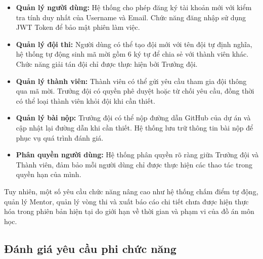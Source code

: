 ﻿\documentclass[12pt,a4paper]{report}
\begin{document}
\begin{itemize}
	\item \textbf{Quản lý người dùng:} Hệ thống cho phép đăng ký tài khoản mới với kiểm tra tính duy nhất của Username và Email. Chức năng đăng nhập sử dụng JWT Token để bảo mật phiên làm việc.
	
	\item \textbf{Quản lý đội thi:} Người dùng có thể tạo đội mới với tên đội tự định nghĩa, hệ thống tự động sinh mã mời gồm 6 ký tự để chia sẻ với thành viên khác. Chức năng giải tán đội chỉ được thực hiện bởi Trưởng đội.
	
	\item \textbf{Quản lý thành viên:} Thành viên có thể gửi yêu cầu tham gia đội thông qua mã mời. Trưởng đội có quyền phê duyệt hoặc từ chối yêu cầu, đồng thời có thể loại thành viên khỏi đội khi cần thiết.
	
	\item \textbf{Quản lý bài nộp:} Trưởng đội có thể nộp đường dẫn GitHub của dự án và cập nhật lại đường dẫn khi cần thiết. Hệ thống lưu trữ thông tin bài nộp để phục vụ quá trình đánh giá.
	
	\item \textbf{Phân quyền người dùng:} Hệ thống phân quyền rõ ràng giữa Trưởng đội và Thành viên, đảm bảo mỗi người dùng chỉ được thực hiện các thao tác trong quyền hạn của mình.
\end{itemize}

Tuy nhiên, một số yêu cầu chức năng nâng cao như hệ thống chấm điểm tự động, quản lý Mentor, quản lý vòng thi và xuất báo cáo chi tiết chưa được hiện thực hóa trong phiên bản hiện tại do giới hạn về thời gian và phạm vi của đồ án môn học.


\subsection{Đánh giá yêu cầu phi chức năng}
\end{document}
